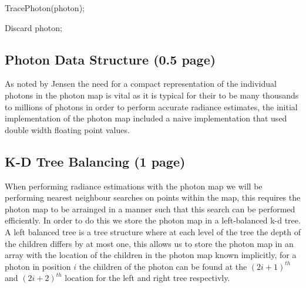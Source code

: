\begin{algorithm}[h!]
	{
		TracePhoton(photon);
	}
	\caption{Photon mapping algothm}
\end{algorithm}

\begin{algorithm}[h!]
	{
	
	}
	{
		Discard photon;
	}
\caption{TracePhoton}
\end{algorithm}

\subsection{Photon Data Structure (0.5 page)}
As noted by Jensen  the need for a compact representation of the individual photons in the photon map is vital
as it is typical for their to be many thousands to millions of photons in order to perform accurate radiance estimates,
the initial implementation of the photon map included a naive implementation that used double width floating point values.

\subsection{K-D Tree Balancing (1 page)}
When performing radiance estimations with the photon map we will be performing nearest neighbour searches on points within
the map, this requires the photon map to be arrainged in a manner such that this search can be performed efficiently.
In order to do this we store the photon map in a left-balanced k-d tree. A left balanced tree is a tree structure where
at each level of the tree the depth of the children differs by at most one, 
this allows us to store the photon map in an array with the location of the children in the photon map known implicitly,
for a photon in position $i$ the children of the photon can be found at the $(2i + 1)^{th}$ and $(2i + 2)^{th}$
location for the left and right tree respectivly.


